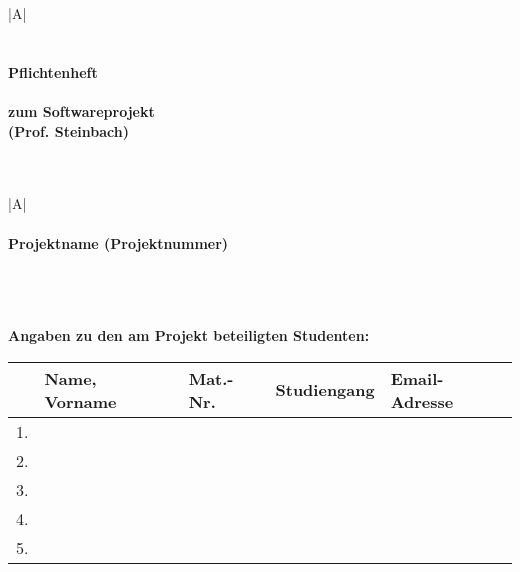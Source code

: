 \documentclass[a4paper,10pt]{report}
\begin{document}
\begin{titlepage}

\begin{center}
\begin{tabular}{|A|}
\hline
\\
\\
\\
\bfseries \Huge \quad \quad \quad  Pflichtenheft   \quad \quad \quad
\\
\\
\Large zum Softwareprojekt\\
\Large (Prof. Steinbach)\\
\\
\\
\hline
\end{tabular}
\end{center}

\vspace{3,5mm}

\begin{center}
\begin{tabular}{|A|}
\hline
\\
\\
\bfseries \Large \quad \quad \quad Projektname (Projektnummer) \quad \quad \quad 
\\
\\
\\
\\
\hline
\end{tabular}
\end{center}

\vspace{9mm}

\bfseries \large Angaben zu den am Projekt beteiligten Studenten:

\begin{center}
\begin{tabular}{|c|l|l|l|l|}
\hline
\rowcolor{Gray}\normalsize &\normalsize Name, Vorname &\normalsize Mat.-Nr. &\normalsize Studiengang &\normalsize Email-Adresse \\
\hline
\rowcolor{lightGray}\normalsize 1. & & & & \\
\hline
\rowcolor{Gray}\normalsize 2. & & & & \\
\hline
\rowcolor{lightGray}\normalsize 3. & & & & \\
\hline
\rowcolor{Gray}\normalsize 4. & & & & \\
\hline
\rowcolor{lightGray}\normalsize 5. & & & & \\
\hline
\end{tabular}
\end{center}


\end{titlepage}
\end{document}
